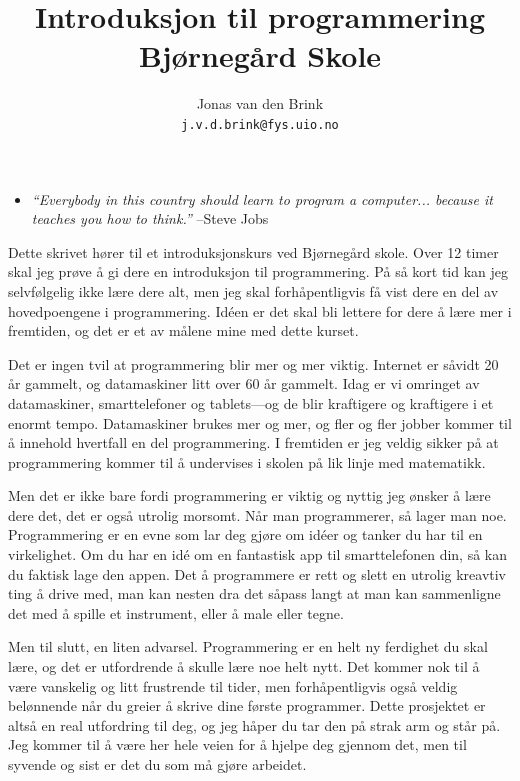 \documentclass[a4paper, 11pt, notitlepage]{article}
\author{Jonas van den Brink \\[-0.2cm] \texttt{j.v.d.brink@fys.uio.no}}
\title{Introduksjon til programmering \\ Bjørnegård Skole}
\begin{document}
\maketitle

\thispagestyle{empty}
\vspace{1.8cm}

\begin{itemize}
	\item[] \emph{``Everybody in this country should learn to program a computer... because it teaches you how to think.''} --Steve Jobs
\end{itemize}

\vspace{0.8cm}

Dette skrivet hører til et introduksjonskurs ved Bjørnegård skole. Over 12 timer skal jeg prøve å gi dere en introduksjon til programmering. På så kort tid kan jeg selvfølgelig ikke lære dere alt, men jeg skal forhåpentligvis få vist dere en del av hovedpoengene i programmering. Idéen er det skal bli lettere for dere å lære mer i fremtiden, og det er et av målene mine med dette kurset.

Det er ingen tvil at programmering blir mer og mer viktig. Internet er såvidt 20 år gammelt, og datamaskiner litt over 60 år gammelt. Idag er vi omringet av datamaskiner, smarttelefoner og tablets---og de blir kraftigere og kraftigere i et enormt tempo. Datamaskiner brukes mer og mer, og fler og fler jobber kommer til å innehold hvertfall en del programmering. I fremtiden er jeg veldig sikker på at programmering kommer til å undervises i skolen på lik linje med matematikk.

Men det er ikke bare fordi programmering er viktig og nyttig jeg ønsker å lære dere det, det er også utrolig morsomt. Når man programmerer, så lager man noe. Programmering er en evne som lar deg gjøre om idéer og tanker du har til en virkelighet. Om du har en idé om en fantastisk app til smarttelefonen din, så kan du faktisk lage den appen. Det å programmere er rett og slett en utrolig kreavtiv ting å drive med, man kan nesten dra det såpass langt at man kan sammenligne det med å spille et instrument, eller å male eller tegne.

Men til slutt, en liten advarsel. Programmering er en helt ny ferdighet du skal lære, og det er utfordrende å skulle lære noe helt nytt. Det kommer nok til å være vanskelig og litt frustrende til tider, men forhåpentligvis også veldig belønnende når du greier å skrive dine første programmer. Dette prosjektet er altså en real utfordring til deg, og jeg håper du tar den på strak arm og står på. Jeg kommer til å være her hele veien for å hjelpe deg gjennom det, men til syvende og sist er det du som må gjøre arbeidet. 
\end{document}
